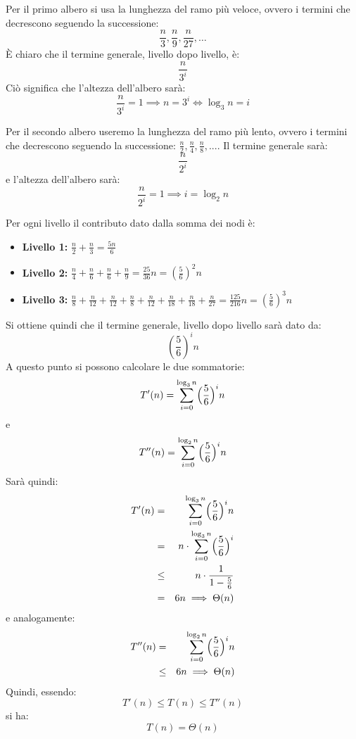 Per il primo albero si usa la lunghezza del ramo più veloce, ovvero i termini che decrescono seguendo la successione: $$\frac{n}{3},\frac{n}{9},\frac{n}{27},\ldots$$ È chiaro che il termine generale, livello dopo livello, è: $$\frac{n}{3^{i}}$$Ciò significa che l'altezza dell'albero sarà:$$\frac{n}{3^{i}}=1 \implies n=3^{i} \iff \log_{3}n=i$$

Per il secondo albero useremo la lunghezza del ramo più lento, ovvero i termini che decrescono seguendo la successione: $\frac{n}{2}, \frac{n}{4}, \frac{n}{8},...$. Il termine generale sarà:$$\frac{n}{2^{i}}$$ e l'altezza dell'albero sarà:$$\frac{n}{2^{i}}=1 \implies i=\log_{2}n$$

Per ogni livello il contributo dato dalla somma dei nodi è:
\begin{itemize}
	\item \textbf{Livello 1:} $\frac{n}{2}+\frac{n}{3}=\frac{5n}{6}$
	\item \textbf{Livello 2:} $\frac{n}{4}+\frac{n}{6}+\frac{n}{6}+\frac{n}{9}=\frac{25}{36}n=(\frac{5}{6})^{2}n$
	\item \textbf{Livello 3:} $\frac{n}{8}+\frac{n}{12}+\frac{n}{12}+\frac{n}{8}+\frac{n}{12}+\frac{n}{18}+\frac{n}{18}+\frac{n}{27}=\frac{125}{216}n=(\frac{5}{6})^{3}n$
\end{itemize}
Si ottiene quindi che il termine generale, livello dopo livello sarà dato da: $$(\frac{5}{6})^{i}n$$
A questo punto si possono calcolare le due sommatorie:
\begin{displaymath}
	T'(n)=\sum_{i=0}^{\log_{3}n}\Bigl(\frac{5}{6}\Bigl)^{i}n
\end{displaymath}
e
\begin{displaymath}
	T''(n)=\sum_{i=0}^{\log_{2}n}\Bigl(\frac{5}{6}\Bigl)^{i}n
\end{displaymath}
Sarà quindi:
\begin{eqnarray*}
	T'(n)&=&\sum_{i=0}^{\log_{3}n}\Bigl(\frac{5}{6}\Bigl)^{i}n\\
	&=& n \cdot \sum_{i=0}^{\log_{3}n}\Bigl(\frac{5}{6}\Bigl)^{i}\\
	&\leq & n\cdot \frac{1}{1-\frac{5}{6}}\\
	&=& 6n \implies \Theta(n)
\end{eqnarray*}
e analogamente:
\begin{eqnarray*}
	T''(n)&=& \sum_{i=0}^{\log_{2}n}\Bigl(\frac{5}{6}\Bigl)^{i}n\\
	&\leq & 6n \implies \Theta(n)
\end{eqnarray*}
Quindi, essendo: $$T'(n) \leq T(n) \leq T''(n)$$
si ha: $$T(n)=\Theta(n)$$

